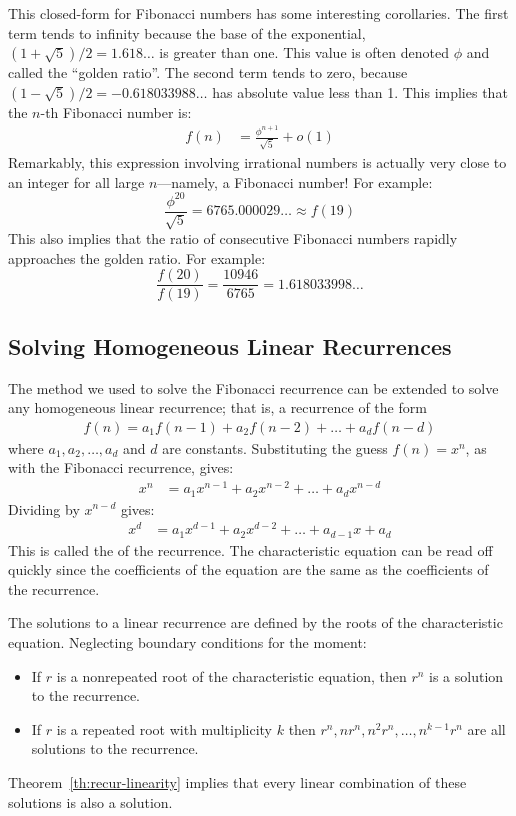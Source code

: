 This closed-form for Fibonacci numbers has some interesting
corollaries.  The first term tends to infinity because the base of the
exponential, $(1+\sqrt{5})/2 = 1.618\ldots$ is greater than one.
This value is often denoted $\phi$ and called the ``golden ratio''.
The second term tends to zero, because $(1-\sqrt{5})/2 =
-0.618033988\ldots$ has absolute value less than 1.  This implies that
the $n$-th Fibonacci number is:
\begin{align*}
f(n) & = \frac{\phi^{n+1}}{\sqrt{5}} + o(1)
\end{align*}
Remarkably, this expression involving irrational numbers is actually
very close to an integer for all large $n$---namely, a Fibonacci
number!  For example:
\begin{equation*}
\frac{\phi^{20}}{\sqrt{5}} = 6765.000029\ldots \approx f(19)
\end{equation*}
This also implies that the ratio of consecutive
Fibonacci numbers rapidly approaches the golden ratio.  For example:
\begin{equation*}
\frac{f(20)}{f(19)} = \frac{10946}{6765} = 1.618033998\ldots
\end{equation*}

\subsection{Solving Homogeneous Linear Recurrences}

The method we used to solve the Fibonacci recurrence can be extended
to solve any homogeneous linear recurrence; that is, a recurrence of
the form
\begin{align*}
f(n) = a_1 f(n-1) + a_2 f(n-2) + \ldots + a_d f(n - d)
\end{align*}
where $a_1, a_2, \ldots, a_d$ and $d$ are constants.  Substituting the
guess $f(n) = x^n$, as with the Fibonacci recurrence, gives:
\begin{align*}
x^n & =a_1x^{n-1} +a_2x^{n-2} + \ldots +a_dx^{n-d}
\end{align*}
Dividing by $x^{n-d}$ gives:
\begin{align*}
x^d & = a_1x^{d-1} + a_2x^{d-2} + \ldots+a_{d-1}x+a_d
\end{align*}
This is called the  of the
recurrence. The characteristic equation can be read off quickly
since the coefficients of the equation are the same as the
coefficients of the recurrence.

The solutions to a linear recurrence are defined by the roots of the
characteristic equation. Neglecting boundary conditions for the
moment:
\begin{itemize}
\item If $r$ is a nonrepeated root of the characteristic equation,
  then $r^n$ is a solution to the recurrence.
\item If $r$ is a repeated root with multiplicity $k$ then $r^n,
  nr^n, n^2r^n, \ldots, n^{k-1}r^n$ are all solutions to the
  recurrence.
\end{itemize}
Theorem~\ref{th:recur-linearity} implies that every linear
  combination of these solutions is also a solution.

